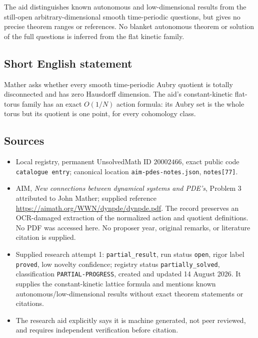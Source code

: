 \documentclass[11pt]{article}
\begin{document}
The aid distinguishes known autonomous and low-dimensional results from the still-open arbitrary-dimensional smooth time-periodic questions, but gives no precise theorem ranges or references. No blanket autonomous theorem or solution of the full questions is inferred from the flat kinetic family.
\subsection{Short English statement}
Mather asks whether every smooth time-periodic Aubry quotient is totally disconnected and has zero Hausdorff dimension. The aid's constant-kinetic flat-torus family has an exact \(O(1/N)\) action formula: its Aubry set is the whole torus but its quotient is one point, for every cohomology class.
\subsection{Sources}
\begin{itemize}
\item Local registry, permanent UnsolvedMath ID \(20002466\), exact public code \texttt{catalogue entry}; canonical location \texttt{aim-pdes-notes.json}, \texttt{notes[77]}.
\item AIM, \emph{New connections between dynamical systems and PDE's}, Problem 3 attributed to John Mather; supplied reference \url{https://aimath.org/WWN/dynpde/dynpde.pdf}. The record preserves an OCR-damaged extraction of the normalized action and quotient definitions. No PDF was accessed here. No proposer year, original remarks, or literature citation is supplied.
\item Supplied research attempt 1: \texttt{partial\_result}, run status \texttt{open}, rigor label \texttt{proved}, low novelty confidence; registry status \texttt{partially\_solved}, classification \texttt{PARTIAL-PROGRESS}, created and updated 14 August 2026. It supplies the constant-kinetic lattice formula and mentions known autonomous/low-dimensional results without exact theorem statements or citations.
\item The research aid explicitly says it is machine generated, not peer reviewed, and requires independent verification before citation.
\end{itemize}
\end{document}
